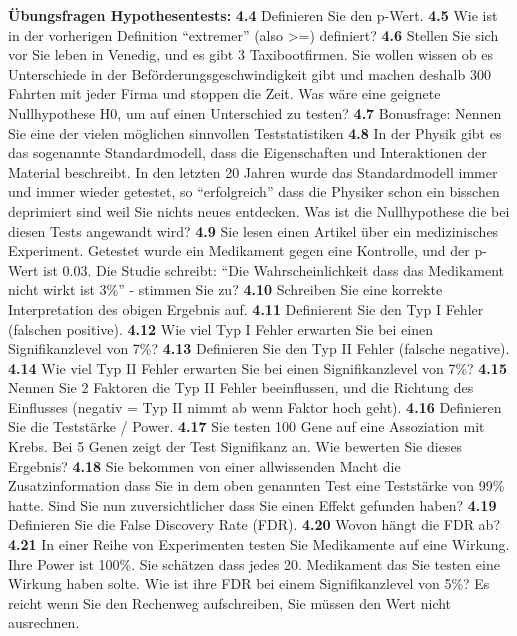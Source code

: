 \documentclass[a4paper,twoside]{tufte-book}\usepackage[]{graphicx}\usepackage[]{color}
\begin{document}
\vspace{1cm}
\begin{fullwidth}
\begin{mdframed}[backgroundcolor=black!10,rightline=false,leftline=false]
    
\textbf{Übungsfragen Hypothesentests:} 
\textbf{4.4} Definieren Sie den p-Wert.
\textbf{4.5} Wie ist in der vorherigen Definition “extremer” (also >=) definiert?
\textbf{4.6} Stellen Sie sich vor Sie leben in Venedig, und es gibt 3 Taxibootfirmen. Sie wollen wissen ob es Unterschiede in der Beförderungsgeschwindigkeit gibt und machen deshalb 300 Fahrten mit jeder Firma und stoppen die Zeit. Was wäre eine geignete Nullhypothese H0, um auf einen Unterschied zu testen?
\textbf{4.7} Bonusfrage: Nennen Sie eine der vielen möglichen sinnvollen Teststatistiken
\textbf{4.8} In der Physik gibt es das sogenannte Standardmodell, dass die Eigenschaften und Interaktionen der Material beschreibt. In den letzten 20 Jahren wurde das Standardmodell immer und immer wieder getestet, so “erfolgreich” dass die Physiker schon ein bisschen deprimiert sind weil Sie nichts neues entdecken. Was ist die Nullhypothese die bei diesen Tests angewandt wird?
\textbf{4.9} Sie lesen einen Artikel über ein medizinisches Experiment. Getestet wurde ein Medikament gegen eine Kontrolle, und der p-Wert ist 0.03. Die Studie schreibt: “Die Wahrscheinlichkeit dass das Medikament nicht wirkt ist 3\%” - stimmen Sie zu?
\textbf{4.10} Schreiben Sie eine korrekte Interpretation des obigen Ergebnis auf.
\textbf{4.11} Definierent Sie den Typ I Fehler (falschen positive).
\textbf{4.12} Wie viel Typ I Fehler erwarten Sie bei einen Signifikanzlevel von 7\%?
\textbf{4.13} Definieren Sie den Typ II Fehler (falsche negative).
\textbf{4.14} Wie viel Typ II Fehler erwarten Sie bei einen Signifikanzlevel von 7\%?
\textbf{4.15} Nennen Sie 2 Faktoren die Typ II Fehler beeinflussen, und die Richtung des Einflusses (negativ = Typ II nimmt ab wenn Faktor hoch geht).
\textbf{4.16} Definieren Sie die Teststärke / Power.
\textbf{4.17} Sie testen 100 Gene auf eine Assoziation mit Krebs. Bei 5 Genen zeigt der Test Signifikanz an. Wie bewerten Sie dieses Ergebnis?
\textbf{4.18} Sie bekommen von einer allwissenden Macht die Zusatzinformation dass Sie in dem oben genannten Test eine Teststärke von 99\% hatte. Sind Sie nun zuversichtlicher dass Sie einen Effekt gefunden haben?
\textbf{4.19} Definieren Sie die False Discovery Rate (FDR).
\textbf{4.20} Wovon hängt die FDR ab?
\textbf{4.21}  In einer Reihe von Experimenten testen Sie Medikamente auf eine Wirkung. Ihre Power ist 100\%. Sie schätzen dass jedes 20. Medikament das Sie testen eine Wirkung haben solte. Wie ist ihre FDR bei einem Signifikanzlevel von 5\%? Es reicht wenn Sie den Rechenweg aufschreiben, Sie müssen den Wert nicht ausrechnen.

\end{mdframed}
\end{fullwidth}
\end{document}
